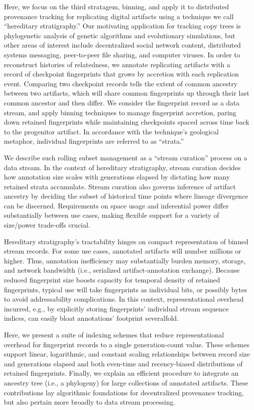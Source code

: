 Here, we focus on the third stratagem, binning, and apply it to distributed provenance tracking for replicating digital artifacts using a technique we call ``hereditary stratigraphy.''
Our motivating application for tracking copy trees is phylogenetic analysis of genetic algorithms and evolutionary simulations, but other areas of interest include decentralized social network content, distributed systems messaging, peer-to-peer file sharing, and computer viruses.
In order to reconstruct histories of relatedness, we annotate replicating artifacts with a record of checkpoint fingerprints that grows by accretion with each replication event.
Comparing two checkpoint records tells the extent of common ancestry between two artifacts, which will share common fingerprints up through their last common ancestor and then differ.
We consider the fingerprint record as a data stream, and apply binning techniques to manage fingerprint accretion, paring down retained fingerprints while maintaining checkpoints spaced across time back to the progenitor artifact.
In accordance with the technique's geological metaphor, individual fingerprints are referred to as ``strata.''

We describe such rolling subset management as a ``stream curation'' process on a data stream.
In the context of hereditary stratigraphy, stream curation decides how annotation size scales with generations elapsed by dictating how many retained strata accumulate.
Stream curation also governs inference of artifact ancestry by deciding the subset of historical time points where lineage divergence can be discerned.
Requirements on space usage and inferential power differ substantially between use cases, making flexible support for a variety of size/power trade-offs crucial.

Hereditary stratigraphy's tractability hinges on compact representation of binned stream records.
For some use cases, annotated artifacts will number millions or higher.
Thus, annotation inefficiency may substantially burden memory, storage, and network bandwidth (i.e., serialized artifact-annotation exchange).
Because reduced fingerprint size boosts capacity for temporal density of retained fingerprints, typical use will take fingerprints as individual bits, or possibly bytes to avoid addressability complications.
In this context, representational overhead incurred, e.g., by explicitly storing fingerprints' individual stream sequence indices, can easily bloat annotations' footprint severalfold.

Here, we present a suite of indexing schemes that reduce representational overhead for fingerprint records to a single generation-count value.
These schemes support linear, logarithmic, and constant scaling relationships between record size and generations elapsed and both even-time and recency-biased distributions of retained fingerprints.
Finally, we explain an efficient procedure to integrate an ancestry tree (i.e., a phylogeny) for large collections of annotated artifacts.
These contributions lay algorithmic foundations for decentralized provenance tracking, but also pertain more broadly to data stream processing.

